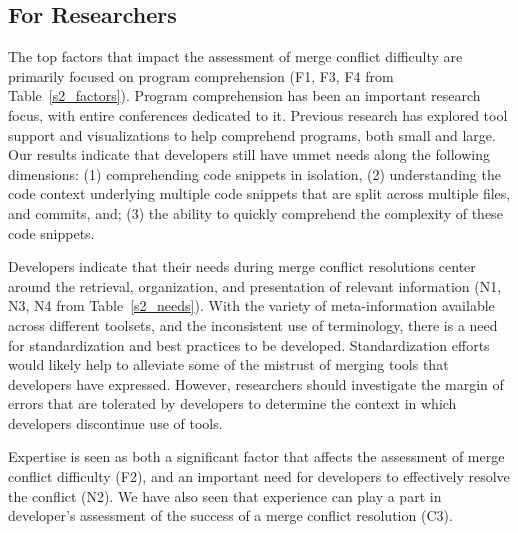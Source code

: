 \subsection{For Researchers}

The top factors that impact the assessment of merge conflict difficulty are primarily focused on program comprehension (F1, F3, F4 from Table~\ref{s2_factors}).
Program comprehension has been an important research focus, with entire conferences dedicated to it.
Previous research has explored tool support and visualizations to help comprehend programs, both small and large.
Our results indicate that developers still have unmet needs along the following dimensions: (1) comprehending code snippets in isolation, (2) understanding the code context underlying multiple code snippets that are split across multiple files, and commits, and; (3) the ability to quickly comprehend the complexity of these code snippets. 


Developers indicate that their needs during merge conflict resolutions center around the retrieval, organization, and presentation of relevant information (N1, N3, N4 from Table~\ref{s2_needs}).
With the variety of meta-information available across different toolsets, and the inconsistent use of terminology, there is a need for standardization and best practices to be developed.
Standardization efforts would likely help to alleviate some of the mistrust of merging tools that developers have expressed.
However, researchers should investigate the margin of errors that are tolerated by developers to determine the context in which developers discontinue use of tools.

Expertise is seen as both a significant factor that affects the assessment of merge conflict difficulty (F2), and an important need for developers to effectively resolve the conflict (N2).
We have also seen that experience can play a part in developer's assessment of the success of a merge conflict resolution (C3).

